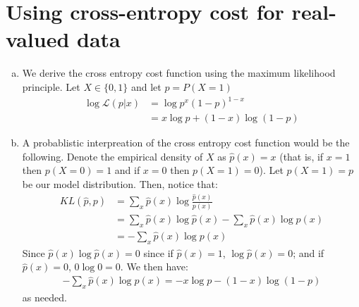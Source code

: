 \documentclass[paper=a4, fontsize=11pt]{scrartcl} %
\numberwithin{equation}{section} %
\numberwithin{figure}{section} %
\numberwithin{table}{section} %
\begin{document}
\section{Using cross-entropy cost for real-valued data}
\begin{enumerate}[(a)]
	\item We derive the cross entropy cost function using the maximum likelihood principle. Let $X\in\{0,1\}$ and let $p = P(X=1)$
	\begin{align*}
	\log \mathcal{L}(p|x) &= \log p^x(1-p)^{1-x}\\
	&= x\log p + (1-x)\log(1-p)
	\end{align*}
	\item A probablistic interpreation of the cross entropy cost function would be the following. Denote the empirical density of $X$ as $\hat{p}(x)=x$ (that is, if $x=1$ then $p(X=0)=1$ and if $x=0$ then $p(X=1)=0$). Let $p(X=1)=p$ be our model distribution. Then, notice that:
	\begin{align*}
	KL(\hat{p},p) &= \sum_{x}\hat{p}(x)\log\frac{\hat{p}(x)}{p(x)}\\
	&= \sum_{x}\hat{p}(x)\log\hat{p}(x) - \sum_{x}\hat{p}(x)\log p(x)\\
	&= - \sum_{x}\hat{p}(x)\log p(x)
	\end{align*}
	Since $\hat{p}(x)\log\hat{p}(x) = 0$ since if $\hat{p}(x)=1$, $\log\hat{p}(x)=0$; and if $\hat{p}(x)=0$, $0\log 0 = 0$. We then have:
	\begin{align*}
	- \sum_{x}\hat{p}(x)\log p(x) = -x\log p -(1-x)\log(1-p)
	\end{align*}
	as needed.
\end{enumerate}

\newpage
\end{document}
